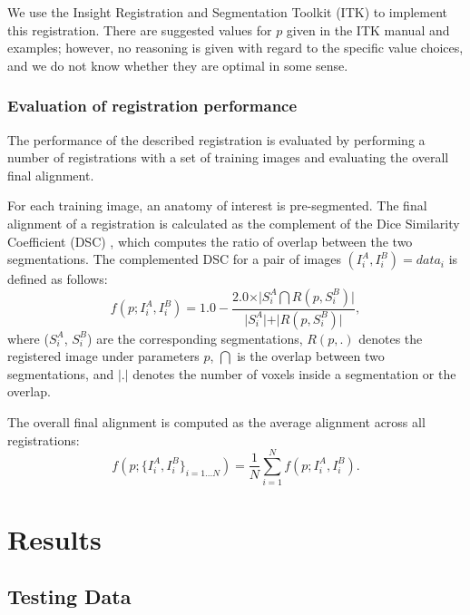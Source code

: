 \documentclass[]{spie}  %
\begin{document}
We use the Insight Registration and Segmentation Toolkit (ITK)\cite{itk:v2.4} to implement this registration. There are suggested values for $p$ given in the ITK manual and examples; however, no reasoning is given with regard to the specific value choices, and we do not know whether they are optimal in some sense.

\subsubsection{Evaluation of registration performance}

The performance of the described registration is evaluated by performing a number of registrations with a set of training images and evaluating the overall final alignment.

For each training image, an anatomy of interest is pre-segmented. The final alignment of a registration is calculated as the complement of the Dice Similarity Coefficient (DSC) \cite{dsc}, which computes the ratio of overlap between the two segmentations. The complemented DSC for a pair of images $(I^A_i, I^B_i)=data_i$ is defined as follows:
\begin{equation}
f(p; I^A_i, I^B_i) = 1.0 - \frac{2.0 \times \vert S^A_i \bigcap R(p,S^B_i) \vert}{\vert S^A_i \vert + \vert R(p,S^B_i) \vert},
\end{equation}
where ($S^A_i$, $S^B_i$) are the corresponding segmentations, $R(p,.)$ denotes the registered image under parameters $p$, $\bigcap$ is the overlap between two segmentations, and $\vert . \vert$ denotes the number of voxels inside a segmentation or the overlap.

The overall final alignment is computed as the average alignment across all registrations:
\begin{equation}\label{eq:f_mean}
f(p; \{I^A_i, I^B_i\}_{i=1...N}) = \frac{1}{N}\sum^N_{i=1} f(p; I^A_i, I^B_i).
\end{equation}


\section{Results}

\subsection{Testing Data}
\end{document}
